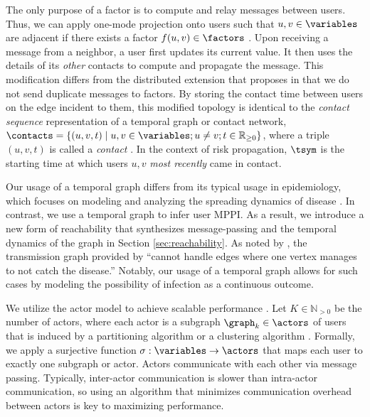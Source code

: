 \par The only purpose of a factor is to compute and relay messages between users. Thus, we can apply one-mode projection onto users such that $u, v \in \variables$ are adjacent if there exists a factor $f(u, v) \in \factors$ \cite{Zhou2007}. Upon receiving a message from a neighbor, a user first updates its current value. It then uses the details of its \emph{other} contacts to compute and propagate the message. This modification differs from the distributed extension that \cite{Ayday2021} proposes in that we do not send duplicate messages to factors. By storing the contact time between users on the edge incident to them, this modified topology is identical to the \emph{contact sequence} representation of a temporal graph or contact network, $\contacts = \{(u, v, t) \mid u, v \in \variables; u \neq v; t \in \mathbb{R}_{\geq 0}\}$, where a triple $(u, v, t)$ is called a \emph{contact} \cite{Holme2012}. In the context of risk propagation, $\tsym$ is the starting time at which users $u, v$ \emph{most recently} came in contact.

\par Our usage of a temporal graph differs from its typical usage in epidemiology, which focuses on modeling and analyzing the spreading dynamics of disease \cite{Riolo2001, Danon2011, Lokhov2014, Craft2015, Pastor-Satorras2015, Koher2019, Zino2021}. In contrast, we use a temporal graph to infer user MPPI. As a result, we introduce a new form of reachability that synthesizes message-passing and the temporal dynamics of the graph in Section \ref{sec:reachability}. As noted by \cite{Holme2012}, the transmission graph provided by \cite{Riolo2001} ``cannot handle edges where one vertex manages to not catch the disease.'' Notably, our usage of a temporal graph allows for such cases by modeling the possibility of infection as a continuous outcome.

\par We utilize the actor model to achieve scalable performance \cite{Baker1977, Agha1986}. Let $K \in \mathbb{N}_{>0}$ be the number of actors, where each actor is a subgraph $\graph_k \in \actors$ of users that is induced by a partitioning algorithm \cite{Buluc2016} or a clustering algorithm \cite{Aggarwal2010}. Formally, we apply a surjective function $\sigma: \variables \rightarrow \actors$ that maps each user to exactly one subgraph or actor. Actors communicate with each other via message passing. Typically, inter-actor communication is slower than intra-actor communication, so using an algorithm that minimizes communication overhead between actors is key to maximizing performance.

